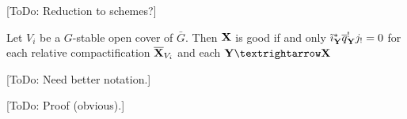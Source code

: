 [ToDo: Reduction to schemes?]
%

\iffalse
\begin{Rem}
    Let $V_i$ be a $G$-equivariant open cover of $\bar G$.
    Then we can consider $Γ$ as a subset of $X × V_i × X$ and take its closure $\bar Γ_i$.
    The sets $\bar Γ_i$ for an open cover cover of $\bar Γ$ and hence the stacks $\stack U_i = \rquot{\bar Γ_i}{G×G}$ form an open cover of $\bar{\stack X}$.
\end{Rem}
\fi%

\begin{Lem}\label{lem:d-mod:strategy:cover-by-relative-compactifications}
    Let $V_i$ be a $G$-stable open cover of $\bar G$.
    Then $\mathbf X$ is good if and only $\tilde\imath_{\mathbf Y}^* \overline q_{\mathbf Y}^! j_! = 0$ for each relative compactification $\overline{\mathbf X}_{V_i}$ and each $\stack Y → \stack X$
\end{Lem}

[ToDo: Need better notation.]

[ToDo: Proof (obvious).]
